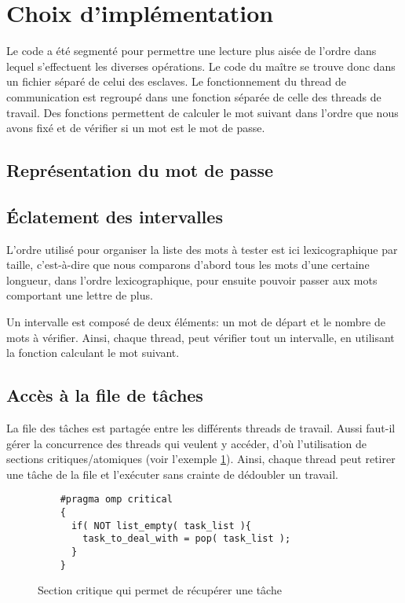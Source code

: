 \section{Choix d'implémentation} %
\label{sec:impl}

Le code a été segmenté pour permettre une lecture plus aisée de l'ordre dans lequel s'effectuent les diverses opérations. Le code du maître se trouve donc dans un fichier séparé de celui des esclaves. Le fonctionnement du thread de communication est regroupé dans une fonction séparée de celle des threads de travail. Des fonctions permettent de calculer le mot suivant dans l'ordre que nous avons fixé et de vérifier si un mot est le mot de passe. 

\subsection{Représentation du mot de passe}


\subsection{\'Eclatement des intervalles}

L'ordre utilisé pour organiser la liste des mots à tester est ici lexicographique par taille, c'est-à-dire que nous comparons d'abord tous les mots d'une certaine longueur, dans l'ordre lexicographique, pour ensuite pouvoir passer aux mots comportant une lettre de plus.

Un intervalle est composé de deux éléments: un mot de départ et le nombre de mots à vérifier. Ainsi, chaque thread, peut vérifier tout un intervalle, en utilisant la fonction calculant le mot suivant.

\subsection{Accès à la file de tâches}

La file des tâches est partagée entre les différents threads de travail. Aussi faut-il gérer la concurrence des threads qui veulent y accéder, d'où l'utilisation de sections critiques/atomiques (voir l'exemple \ref{critical}). Ainsi, chaque thread peut retirer une tâche de la file et l'exécuter sans crainte de dédoubler un travail. 

\begin{figure}
\begin{lstlisting}
	#pragma omp critical
	{
	  if( NOT list_empty( task_list ){
	    task_to_deal_with = pop( task_list );
	  }
	}
\end{lstlisting}
\caption{Section critique qui permet de récupérer une tâche}
\label{critical}
\end{figure}